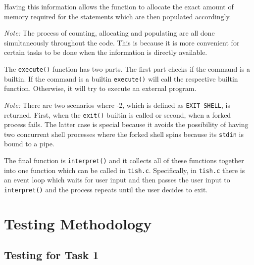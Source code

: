 \documentclass[12pt]{article}
\begin{document}
Having this information allows the function to allocate the
exact amount of memory required for the statements which are
then populated accordingly.

\textit{Note:} The process of counting, allocating and
populating are all done simultaneously throughout the code. This
is because it is more convenient for certain tasks to be done
when the information is directly available.

The \texttt{execute()} function has two parts. The first part
checks if the command is a builtin. If the command is a builtin
\texttt{execute()} will call the respective builtin function.
Otherwise, it will try to execute an external program.

\textit{Note:} There are two scenarios where -2, which is
defined as \texttt{EXIT\_SHELL}, is returned. First, when the
\texttt{exit()} builtin is called or second, when a forked
process fails. The latter case is special because it avoids the
possibility of having two concurrent shell processes where the
forked shell spins because its \texttt{stdin} is bound to a
pipe.

The final function is \texttt{interpret()} and it collects all
of these functions together into one function which can be
called in \texttt{tish.c}. Specifically, in \texttt{tish.c}
there is an event loop which waits for user input and then
passes the user input to \texttt{interpret()} and the process
repeats until the user decides to exit.

\section{Testing Methodology}

\subsection{Testing for Task 1}
\end{document}
